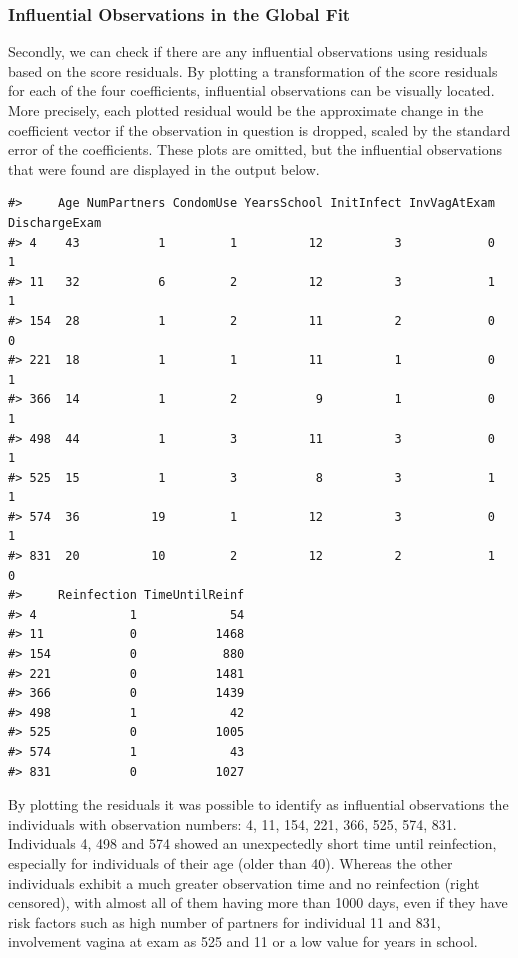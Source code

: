 \documentclass[
]{article}
\begin{document}
\hypertarget{influential-observations-in-the-global-fit}{%
\subsubsection{Influential Observations in the Global Fit}\label{influential-observations-in-the-global-fit}}

Secondly, we can check if there are any influential observations using residuals based on the score residuals. By plotting a transformation of the score residuals for each of the four coefficients, influential observations can be visually located. More precisely, each plotted residual would be the approximate change in the coefficient vector if the observation in question is dropped, scaled by the standard error of the coefficients. These plots are omitted, but the influential observations that were found are displayed in the output below.

\begin{verbatim}
#>     Age NumPartners CondomUse YearsSchool InitInfect InvVagAtExam DischargeExam
#> 4    43           1         1          12          3            0             1
#> 11   32           6         2          12          3            1             1
#> 154  28           1         2          11          2            0             0
#> 221  18           1         1          11          1            0             1
#> 366  14           1         2           9          1            0             1
#> 498  44           1         3          11          3            0             1
#> 525  15           1         3           8          3            1             1
#> 574  36          19         1          12          3            0             1
#> 831  20          10         2          12          2            1             0
#>     Reinfection TimeUntilReinf
#> 4             1             54
#> 11            0           1468
#> 154           0            880
#> 221           0           1481
#> 366           0           1439
#> 498           1             42
#> 525           0           1005
#> 574           1             43
#> 831           0           1027
\end{verbatim}

By plotting the residuals it was possible to identify as influential observations the individuals with observation numbers: 4, 11, 154, 221, 366, 525, 574, 831. Individuals 4, 498 and 574 showed an unexpectedly short time until reinfection, especially for individuals of their age (older than 40).
Whereas the other individuals exhibit a much greater observation time and no reinfection (right censored), with almost all of them having more than 1000 days, even if they have risk factors such as high number of partners for individual 11 and 831, involvement vagina at exam as 525 and 11 or a low value for years in school.
\end{document}
